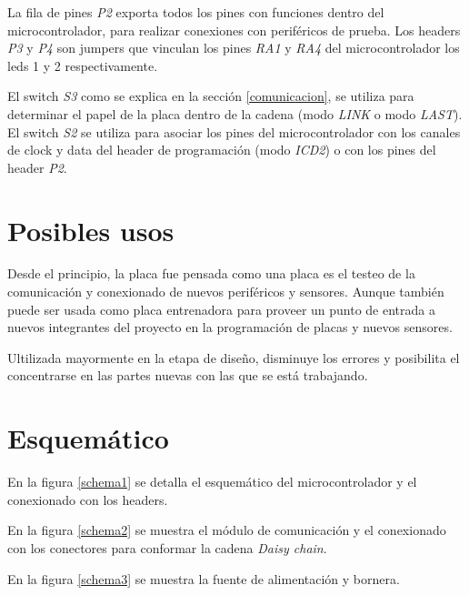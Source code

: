 \documentclass[a4paper,10pt]{article}
\begin{document}
La fila de pines \emph{P2} exporta todos los pines con funciones dentro del microcontrolador, para realizar conexiones con perif\'ericos de prueba.
Los headers \emph{P3} y \emph{P4} son jumpers que vinculan los pines \emph{RA1} y \emph{RA4} del microcontrolador los leds 1 y 2 respectivamente.

El switch \emph{S3} como se explica en la secci\'on \ref{comunicacion}, se utiliza para determinar el papel de la placa dentro de la cadena (modo \emph{LINK} o modo \emph{LAST}).
El switch \emph{S2} se utiliza para asociar los pines del microcontrolador con los canales de clock y data del header de programaci\'on (modo \emph{ICD2}) o con los pines del header \emph{P2}.


\section{Posibles usos}
\label{usos}

Desde el principio, la placa fue pensada como una placa es el testeo de la comunicaci\'on y conexionado de nuevos perif\'ericos y sensores.
Aunque tambi\'en puede ser usada como placa entrenadora para proveer un punto de entrada a nuevos integrantes del proyecto en la programaci\'on de placas y nuevos sensores.

Ultilizada mayormente en la etapa de dise\~no, disminuye los errores y posibilita el concentrarse en las partes nuevas con las que se est\'a trabajando.

\section{Esquem\'atico}
\label{esquematico}

En la figura \ref{schema1} se detalla el esquem\'atico del microcontrolador y el conexionado con los headers.

En la figura \ref{schema2} se muestra el m\'odulo de comunicaci\'on y el conexionado con los conectores para conformar la cadena \emph{Daisy chain}.

En la figura \ref{schema3} se muestra la fuente de alimentaci\'on y bornera.
\end{document}
